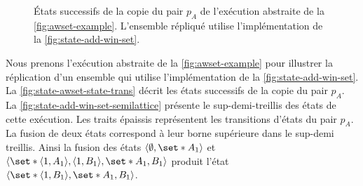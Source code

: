 \begin{figure}[tbh]
\centering
{}
\caption{États successifs de la copie du pair $p_A$ de l'exécution abstraite de la \autoref{fig:awset-example}.
L'ensemble répliqué utilise l'implémentation de la \autoref{fig:state-add-win-set}.}\label{fig:state-awset-state-trans}
\end{figure}

Nous prenons l’exécution abstraite de la \autoref{fig:awset-example} pour illustrer la réplication d’un ensemble qui utilise l’implémentation de la \autoref{fig:state-add-win-set}.
La \autoref{fig:state-awset-state-trans} décrit les états successifs de la copie du pair $p_A$.
La \autoref{fig:state-add-win-set-semilattice} présente le sup-demi-treillis des états de cette exécution.
Les traits épaissis représentent les transitions d'états du pair $p_A$.
La fusion de deux états correspond à leur borne supérieure dans le sup-demi treillis.
Ainsi la fusion des états $\tuple*{\emptyset,\set*{A_1}}$ et $\tuple*{\set*{\tuple*{1,A_1},\tuple*{1,B_1}},\set*{A_1,B_1}}$ produit l'état $\tuple*{\set*{\tuple*{1,B_1}},\set*{A_1,B_1}}$.

